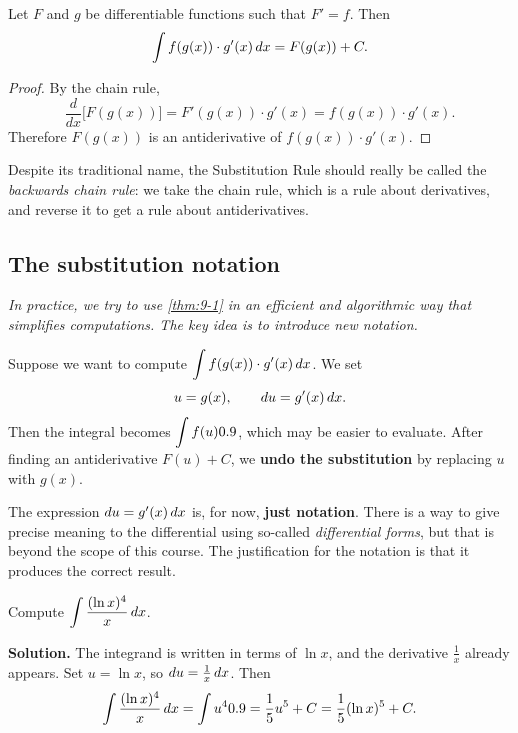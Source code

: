 \begin{theorem}
\label{thm:9-1}
Let $F$ and $g$ be differentiable functions such that $F' = f$.  Then
\[
  \int f(g(x))\cdot g'(x)\,dx = F(g(x)) + C.
\]
\end{theorem}

\begin{proof}
By the chain rule,
\[
  \frac{d}{dx}\bigl[F(g(x))\bigr] = F'(g(x))\cdot g'(x) = f(g(x))\cdot g'(x).
\]
Therefore $F(g(x))$ is an antiderivative of $f(g(x))\cdot g'(x)$.
\end{proof}

\begin{remark}
Despite its traditional name, the Substitution Rule should really be called the \textit{backwards chain rule}: we take the chain rule, which is a rule about derivatives, and reverse it to get a rule about antiderivatives.
\end{remark}

\subsection*{The substitution notation}

\textit{In practice, we try to use \cref{thm:9-1} in an efficient and algorithmic way that simplifies computations.  The key idea is to introduce new notation.}

Suppose we want to compute $\displaystyle\int f(g(x))\cdot g'(x)\,dx$.  We set
\[
  u = g(x), \qquad du = g'(x)\,dx.
\]
Then the integral becomes $\displaystyle\int f(u)0.9$, which may be easier to evaluate.  After finding an antiderivative $F(u) + C$, we \textbf{undo the substitution} by replacing $u$ with $g(x)$.

\begin{remark}
The expression $du = g'(x)\,dx$ is, for now, \textbf{just notation}.  There is a way to give precise meaning to the differential using so-called \textit{differential forms}, but that is beyond the scope of this course.  The justification for the notation is that it produces the correct result.
\end{remark}

\begin{example}
\label{ex:9-2}
Compute $\displaystyle\int \frac{(\ln x)^{4}}{x}\,dx$.

\textbf{Solution.}  The integrand is written in terms of $\ln x$, and the derivative $\frac{1}{x}$ already appears.  Set $u = \ln x$, so $du = \frac{1}{x}\,dx$.  Then
\[
  \int \frac{(\ln x)^{4}}{x}\,dx = \int u^{4}0.9 = \frac{1}{5}u^{5} + C = \frac{1}{5}(\ln x)^{5} + C.
\]
\end{example}

